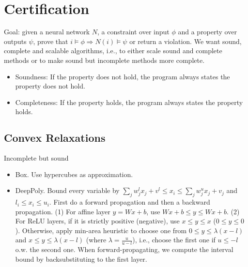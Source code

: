 \section{Certification}
Goal: given a neural network $N$, a constraint over input $\phi$ and a property over outputs $\psi$, prove that $i \vDash \phi \Rightarrow N(i) \vDash \psi$ or return a violation. We want sound, complete and scalable algorithms, i.e., to either scale sound and complete methods or to make sound but incomplete methods more complete.
\begin{itemize}
    \item Soundness: If the property does not hold, the program always states the property does not hold.
    \item Completeness: If the property holds, the program always states the property holds.
\end{itemize}

\subsection*{Convex Relaxations}
Incomplete but sound
\begin{itemize}
    \item Box. Use hypercubes as approximation.
    \item DeepPoly. Bound every variable by $\sum_j w^l_jx_j + v^l \leq x_i \leq \sum_j w^u_j x_j +v_j$ and $l_i \le x_i \le u_i$. First do a forward propagation and then a backward propagation. (1) For affine layer $y=Wx+b$, use $Wx+b\le y\le Wx+b$. (2) For ReLU layers, if it is strictly positive (negative), use $x\le y\le x$ ($0\le y\le 0$). Otherwise, apply min-area heuristic to choose one from $0\le y\le \lambda(x-l)$ and $x\le y \le \lambda(x-l)$ (where $\lambda=\frac{u}{u-l}$), i.e., choose the first one if $u\leq -l$ o.w. the second one. When forward-propagating, we compute the interval bound by backsubstituting to the first layer.
\end{itemize}

